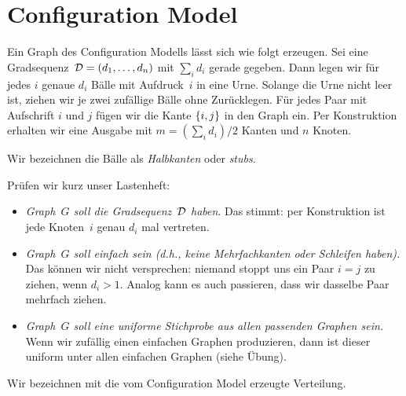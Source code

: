 \section{Configuration Model}
Ein Graph des Configuration Modells lässt sich wie folgt erzeugen.
Sei eine Gradsequenz~$\mathcal{D} = (d_1, \ldots, d_n)$ mit $\sum_i d_i$ gerade gegeben.
Dann legen wir für jedes $i$ genaue $d_i$ Bälle mit Aufdruck~$i$ in eine Urne.
Solange die Urne nicht leer ist, ziehen wir je zwei zufällige Bälle ohne Zurücklegen.
Für jedes Paar mit Aufschrift $i$ und $j$ fügen wir die Kante $\left\{i, j\right\}$ in den Graph ein.
Per Konstruktion erhalten wir eine Ausgabe mit $m = (\sum_i d_i) / 2$ Kanten und $n$ Knoten.

Wir bezeichnen die Bälle als \emph{Halbkanten} oder \emph{stubs}.

\noindent
Prüfen wir kurz unser Lastenheft:
\begin{itemize}
    \item \emph{Graph~$G$ soll die Gradsequenz~$\mathcal{D}$ haben}.
          Das stimmt: per Konstruktion ist jede Knoten~$i$ genau $d_i$ mal vertreten.

    \item \emph{Graph~$G$ soll einfach sein (d.h., keine Mehrfachkanten oder Schleifen haben).}
          Das können wir nicht versprechen: niemand stoppt uns ein Paar $i = j$ zu ziehen, wenn $d_i > 1$.
          Analog kann es auch passieren, dass wir dasselbe Paar mehrfach ziehen.

    \item \emph{Graph~$G$ soll eine uniforme Stichprobe aus allen passenden Graphen sein.}
          Wenn wir zufällig einen einfachen Graphen produzieren, dann ist dieser uniform unter allen einfachen Graphen (siehe Übung).
\end{itemize}

Wir bezeichnen mit \CMd die vom Configuration Model erzeugte Verteilung.

